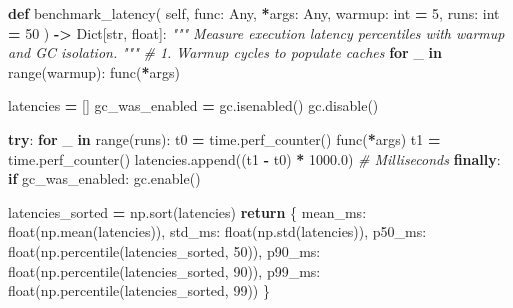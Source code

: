 \documentclass[
  letterpaper,
]{scrbook}
\newenvironment{Shaded}{\begin{snugshade}}{\end{snugshade}}
\newcommand{\BuiltInTok}[1]{#1}
\newcommand{\CommentTok}[1]{\textcolor[rgb]{0.56,0.35,0.01}{\textit{#1}}}
\newcommand{\ControlFlowTok}[1]{\textcolor[rgb]{0.13,0.29,0.53}{\textbf{#1}}}
\newcommand{\DecValTok}[1]{\textcolor[rgb]{0.00,0.00,0.81}{#1}}
\newcommand{\FloatTok}[1]{\textcolor[rgb]{0.00,0.00,0.81}{#1}}
\newcommand{\KeywordTok}[1]{\textcolor[rgb]{0.13,0.29,0.53}{\textbf{#1}}}
\newcommand{\NormalTok}[1]{#1}
\newcommand{\OperatorTok}[1]{\textcolor[rgb]{0.81,0.36,0.00}{\textbf{#1}}}
\newcommand{\StringTok}[1]{\textcolor[rgb]{0.31,0.60,0.02}{#1}}
\newcommand{\VariableTok}[1]{\textcolor[rgb]{0.00,0.00,0.00}{#1}}
\begin{document}
\begin{Shaded}
\begin{Highlighting}[]
    \KeywordTok{def}\NormalTok{ benchmark\_latency(}
        \VariableTok{self}\NormalTok{,}
\NormalTok{        func: Any,}
        \OperatorTok{*}\NormalTok{args: Any,}
\NormalTok{        warmup: }\BuiltInTok{int} \OperatorTok{=} \DecValTok{5}\NormalTok{,}
\NormalTok{        runs: }\BuiltInTok{int} \OperatorTok{=} \DecValTok{50}
\NormalTok{    ) }\OperatorTok{{-}\textgreater{}}\NormalTok{ Dict[}\BuiltInTok{str}\NormalTok{, }\BuiltInTok{float}\NormalTok{]:}
        \CommentTok{"""}
\CommentTok{        Measure execution latency percentiles with warmup and GC isolation.}
\CommentTok{        """}
        \CommentTok{\# 1. Warmup cycles to populate caches}
        \ControlFlowTok{for}\NormalTok{ \_ }\KeywordTok{in} \BuiltInTok{range}\NormalTok{(warmup):}
\NormalTok{            func(}\OperatorTok{*}\NormalTok{args)}

\NormalTok{        latencies }\OperatorTok{=}\NormalTok{ []}
\NormalTok{        gc\_was\_enabled }\OperatorTok{=}\NormalTok{ gc.isenabled()}
\NormalTok{        gc.disable()}

        \ControlFlowTok{try}\NormalTok{:}
            \ControlFlowTok{for}\NormalTok{ \_ }\KeywordTok{in} \BuiltInTok{range}\NormalTok{(runs):}
\NormalTok{                t0 }\OperatorTok{=}\NormalTok{ time.perf\_counter()}
\NormalTok{                func(}\OperatorTok{*}\NormalTok{args)}
\NormalTok{                t1 }\OperatorTok{=}\NormalTok{ time.perf\_counter()}
\NormalTok{                latencies.append((t1 }\OperatorTok{{-}}\NormalTok{ t0) }\OperatorTok{*} \FloatTok{1000.0}\NormalTok{)  }\CommentTok{\# Milliseconds}
        \ControlFlowTok{finally}\NormalTok{:}
            \ControlFlowTok{if}\NormalTok{ gc\_was\_enabled:}
\NormalTok{                gc.enable()}

\NormalTok{        latencies\_sorted }\OperatorTok{=}\NormalTok{ np.sort(latencies)}
        \ControlFlowTok{return}\NormalTok{ \{}
            \StringTok{\textquotesingle{}mean\_ms\textquotesingle{}}\NormalTok{: }\BuiltInTok{float}\NormalTok{(np.mean(latencies)),}
            \StringTok{\textquotesingle{}std\_ms\textquotesingle{}}\NormalTok{: }\BuiltInTok{float}\NormalTok{(np.std(latencies)),}
            \StringTok{\textquotesingle{}p50\_ms\textquotesingle{}}\NormalTok{: }\BuiltInTok{float}\NormalTok{(np.percentile(latencies\_sorted, }\DecValTok{50}\NormalTok{)),}
            \StringTok{\textquotesingle{}p90\_ms\textquotesingle{}}\NormalTok{: }\BuiltInTok{float}\NormalTok{(np.percentile(latencies\_sorted, }\DecValTok{90}\NormalTok{)),}
            \StringTok{\textquotesingle{}p99\_ms\textquotesingle{}}\NormalTok{: }\BuiltInTok{float}\NormalTok{(np.percentile(latencies\_sorted, }\DecValTok{99}\NormalTok{))}
\NormalTok{        \}}


\end{Highlighting}
\end{Shaded}
\end{document}

